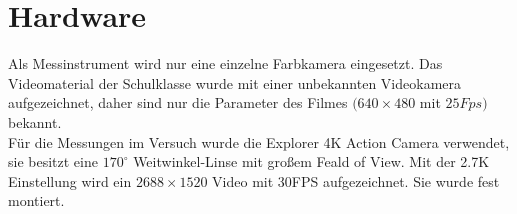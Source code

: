 \section{Hardware}
\label{hardware}
Als Messinstrument wird nur eine einzelne Farbkamera eingesetzt. Das Videomaterial der Schulklasse wurde mit einer unbekannten Videokamera aufgezeichnet, daher sind nur die Parameter des Filmes $(640 \times 480$ mit $25Fps)$ bekannt.\\
Für die Messungen im Versuch wurde die Explorer 4K Action Camera verwendet, sie besitzt eine $170^\circ$ Weitwinkel-Linse mit großem Feald of View. Mit der 2.7K Einstellung wird ein $2688 \times 1520$ Video mit 30FPS aufgezeichnet. Sie wurde fest montiert.